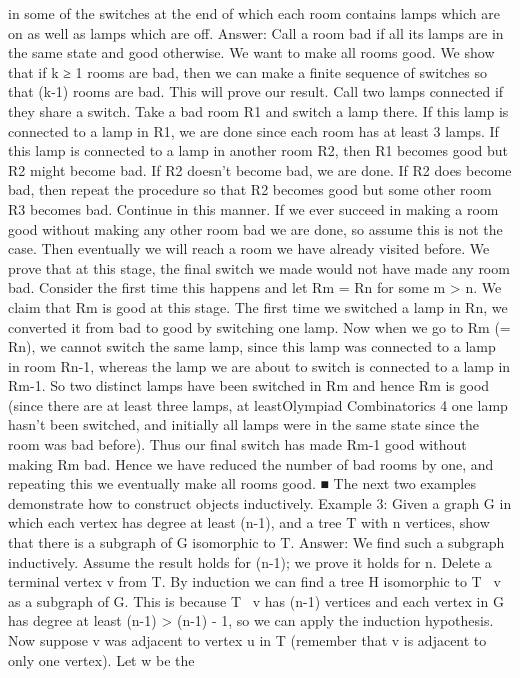 \documentclass[a4paper,11pt]{book}
\begin{document}
in some of the switches at the end of which each room contains
lamps which are on as well as lamps which are off.
Answer:
Call a room bad if all its lamps are in the same state and good
otherwise. We want to make all rooms good. We show that if k ≥ 1
rooms are bad, then we can make a finite sequence of switches so
that (k-1) rooms are bad. This will prove our result.
Call two lamps connected if they share a switch. Take a bad
room R1 and switch a lamp there. If this lamp is connected to a
lamp in R1, we are done since each room has at least 3 lamps. If
this lamp is connected to a lamp in another room R2, then R1
becomes good but R2 might become bad. If R2 doesn’t become bad,
we are done. If R2 does become bad, then repeat the procedure so
that R2 becomes good but some other room R3 becomes bad.
Continue in this manner. If we ever succeed in making a room
good without making any other room bad we are done, so assume
this is not the case. Then eventually we will reach a room we have
already visited before. We prove that at this stage, the final switch
we made would not have made any room bad.
Consider the first time this happens and let Rm = Rn for some m
> n. We claim that Rm is good at this stage. The first time we
switched a lamp in Rn, we converted it from bad to good by
switching one lamp. Now when we go to Rm (= Rn), we cannot
switch the same lamp, since this lamp was connected to a lamp in
room Rn-1, whereas the lamp we are about to switch is connected
to a lamp in Rm-1. So two distinct lamps have been switched in Rm
and hence Rm is good (since there are at least three lamps, at leastOlympiad Combinatorics 4
one lamp hasn’t been switched, and initially all lamps were in the
same state since the room was bad before). Thus our final switch
has made Rm-1 good without making Rm bad. Hence we have
reduced the number of bad rooms by one, and repeating this we
eventually make all rooms good. ■
The next two examples demonstrate how to construct objects
inductively.
Example 3:
Given a graph G in which each vertex has degree at least (n-1), and
a tree T with n vertices, show that there is a subgraph of G
isomorphic to T.
Answer:
We find such a subgraph inductively. Assume the result holds for
(n-1); we prove it holds for n. Delete a terminal vertex v from T. By
induction we can find a tree H isomorphic to T \ {v} as a subgraph
of G. This is because T \ {v} has (n-1) vertices and each vertex in G
has degree at least (n-1) > (n-1) - 1, so we can apply the induction
hypothesis. Now suppose v was adjacent to vertex u in T
(remember that v is adjacent to only one vertex). Let w be the
\end{document}
